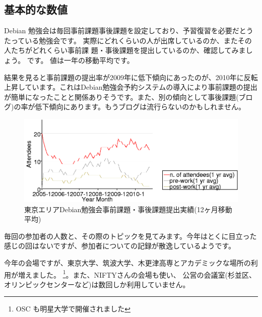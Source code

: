 \documentclass[mingoth,a4paper]{jsarticle}
\begin{document}
\subsection{基本的な数値}

Debian 勉強会は毎回事前課題事後課題を設定しており、予習復習を必要だとう
たっている勉強会です。
実際にどれくらいの人が出席しているのか、またその人たちがどれくらい事前課
題・事後課題を提出しているのか、確認してみましょう。
です。
値は一年の移動平均です。

結果を見ると事前課題の提出率が2009年に低下傾向にあったのが、2010年に反転
上昇しています。これはDebian勉強会予約システムの導入により事前課題の提出
が簡単になったことと関係ありそうです。また、別の傾向として事後課題(ブロ
グ)の率が低下傾向にあります。もうブログは流行らないのかもしれません。

\begin{figure}[ht]
 \includegraphics[width=0.5\hsize]{image201012/memberanalysis/attend.png}
\caption{東京エリアDebian勉強会事前課題・事後課題提出実績(12ヶ月移動平均)}\label{fig:attendandprepostwork}
\end{figure}

毎回の参加者の人数と、その際のトピックを見てみます。今年はとくに目立った
感じの回はないですが、参加者についての記録が散逸しているようです。

今年の会場ですが、東京大学、筑波大学、木更津高専とアカデミックな場所の利
用が増えました。
\footnote{OSC も明星大学で開催されました}。また、NIFTYさんの会場も使い、
公営の会議室(杉並区、オリンピックセンターなど)は数回しか利用していません。
\end{document}
